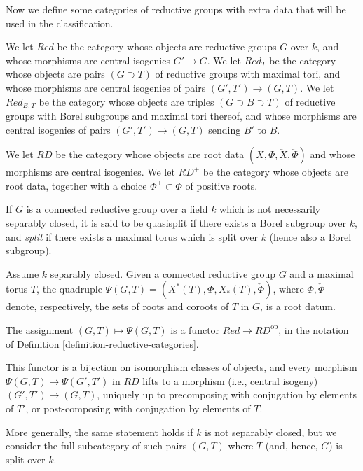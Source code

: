 Now we define some categories of reductive groups with extra data that will be used in the classification.

\begin{definition}
 \label{definition-reductive-categories}
We let $Red$ be the category whose objects are reductive groups $G$ over $k$, and whose morphisms are central isogenies $G'\to G$. We let $Red_T$ be the category whose objects are pairs $(G\supset T)$ of reductive groups with maximal tori, and whose morphisms are central isogenies of pairs $(G',T')\to (G,T)$. We let $Red_{B,T}$ be the category whose objects are triples $(G\supset B\supset T)$ of reductive groups with Borel subgroups and maximal tori thereof, and whose morphisms are central isogenies of pairs $(G',T')\to (G,T)$ sending $B'$ to $B$.

We let $RD$ be the category whose objects are root data $(X,\Phi, \check X,\check\Phi)$ and whose morphisms are central isogenies. We let $RD^+$ be the category whose objects are root data, together with a choice $\Phi^+\subset \Phi$ of positive roots.
\end{definition}

\begin{definition}
 If $G$ is a connected reductive group over a field $k$ which is not necessarily separably closed, it is said to be {quasisplit} if there exists a Borel subgroup over $k$, and {\it split} if there exists a maximal torus which is split over $k$ (hence also a Borel subgroup). 
\end{definition}



\begin{theorem}
\label{theorem-classification-reductive}
 Assume $k$ separably closed. Given a connected reductive group $G$ and a maximal torus $T$, the quadruple $\Psi(G,T)=(X^*(T), \Phi, X_*(T), \check\Phi)$, where $\Phi,\check\Phi$ denote, respectively, the sets of roots and coroots of $T$ in $G$, is a root datum.
 
 The assignment $(G,T)\mapsto \Psi(G,T)$ is a functor $Red \to RD^{\text{op}}$, in the notation of Definition \ref{definition-reductive-categories}.
 
 This functor is a bijection on isomorphism classes of objects, and every morphism $\Psi(G,T)\to \Psi(G',T')$ in $RD$ lifts to a morphism (i.e., central isogeny) $(G',T')\to (G,T)$, uniquely up to precomposing with conjugation by elements of $T'$, or post-composing with conjugation by elements of $T$.
 
 More generally, the same statement holds if $k$ is not separably closed, but we consider the full subcategory of such pairs $(G,T)$ where $T$ (and, hence, $G$) is split over $k$.
\end{theorem}

